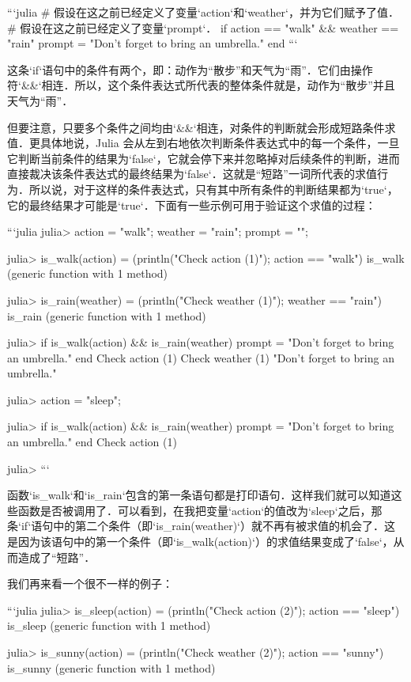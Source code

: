 ```julia
# 假设在这之前已经定义了变量`action`和`weather`，并为它们赋予了值．
# 假设在这之前已经定义了变量`prompt`．
if action == "walk" && weather == "rain"
    prompt = "Don't forget to bring an umbrella."
end
```

这条`if`语句中的条件有两个，即：动作为“散步”和天气为“雨”．它们由操作符`&&`相连．所以，这个条件表达式所代表的整体条件就是，动作为“散步”并且天气为“雨”．

但要注意，只要多个条件之间均由`&&`相连，对条件的判断就会形成短路条件求值．更具体地说，Julia 会从左到右地依次判断条件表达式中的每一个条件，一旦它判断当前条件的结果为`false`，它就会停下来并忽略掉对后续条件的判断，进而直接裁决该条件表达式的最终结果为`false`．这就是“短路”一词所代表的求值行为．所以说，对于这样的条件表达式，只有其中所有条件的判断结果都为`true`，它的最终结果才可能是`true`．下面有一些示例可用于验证这个求值的过程：

```julia
julia> action = "walk"; weather = "rain"; prompt = "";

julia> is_walk(action) = (println("Check action (1)"); action == "walk")
is_walk (generic function with 1 method)

julia> is_rain(weather) = (println("Check weather (1)"); weather == "rain")
is_rain (generic function with 1 method)

julia> if is_walk(action) && is_rain(weather)
           prompt = "Don't forget to bring an umbrella."
       end
Check action (1)
Check weather (1)
"Don't forget to bring an umbrella."

julia> action = "sleep";

julia> if is_walk(action) && is_rain(weather)
           prompt = "Don't forget to bring an umbrella."
       end
Check action (1)

julia> 
```

函数`is_walk`和`is_rain`包含的第一条语句都是打印语句．这样我们就可以知道这些函数是否被调用了．可以看到，在我把变量`action`的值改为`sleep`之后，那条`if`语句中的第二个条件（即`is_rain(weather)`）就不再有被求值的机会了．这是因为该语句中的第一个条件（即`is_walk(action)`）的求值结果变成了`false`，从而造成了“短路”．

我们再来看一个很不一样的例子：

```julia
julia> is_sleep(action) = (println("Check action (2)"); action == "sleep")
is_sleep (generic function with 1 method)

julia> is_sunny(action) = (println("Check weather (2)"); action == "sunny")
is_sunny (generic function with 1 method)

